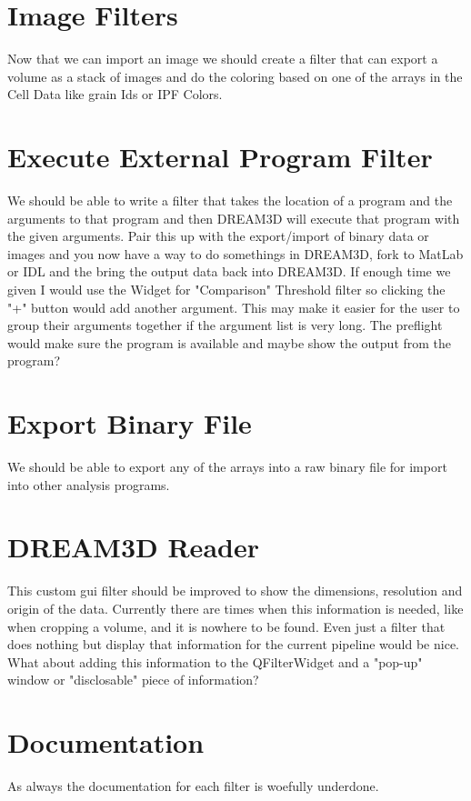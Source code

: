 \documentclass[12pt]{article} %
\begin{document}
\section{Image Filters}
   Now that we can import an image we should create a filter that can export a volume as a stack of images and do the coloring based on one of the arrays in the Cell Data like grain Ids or IPF Colors.
   
\section{Execute External Program Filter}
	We should be able to write a filter that takes the location of a program and the arguments to that program and then DREAM3D will execute that program with the given arguments. Pair this up with the export/import of binary data or images and you now have a way to do somethings in DREAM3D, fork to MatLab or IDL and the bring the output data back into DREAM3D. If enough time we given I would use the Widget for "Comparison" Threshold filter so clicking the "+" button would add another argument. This may make it easier for the user to group their arguments together if the argument list is very long. The preflight would make sure the program is available and maybe show the output from the program?

\section{Export Binary File}
  We should be able to export any of the arrays into a raw binary file for import into other analysis programs. 
  
\section{DREAM3D Reader}
  This custom gui filter should be improved to show the dimensions, resolution and origin of the data. Currently there are times when this information is needed, like when cropping a volume, and it is nowhere to be found. Even just a filter that does nothing but display that information for the current pipeline would be nice.\\
   What about adding this information to the QFilterWidget and a "pop-up" window or "disclosable" piece of information?

\section{Documentation}
  As always the documentation for each filter is woefully underdone.
  
\end{document}
